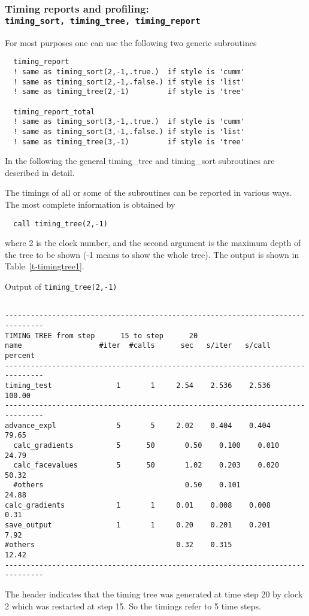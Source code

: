 \documentclass[10pt]{article}
\begin{document}
\subsubsection{Timing reports and profiling: \\
      {\tt timing\_sort, timing\_tree, timing\_report}}

For most purposes one can use the following two generic subroutines
\begin{verbatim}
  timing_report  
  ! same as timing_sort(2,-1,.true.)  if style is 'cumm'
  ! same as timing_sort(2,-1,.false.) if style is 'list'
  ! same as timing_tree(2,-1)         if style is 'tree'

  timing_report_total
  ! same as timing_sort(3,-1,.true.)  if style is 'cumm'
  ! same as timing_sort(3,-1,.false.) if style is 'list'
  ! same as timing_tree(3,-1)         if style is 'tree'
\end{verbatim}
In the following the general timing\_tree and timing\_sort
subroutines are described in detail. 

The timings of all or some of the subroutines can be reported
in various ways. The most complete information is obtained by
\begin{verbatim}
  call timing_tree(2,-1)
\end{verbatim}
where 2 is the clock number, and the second argument is the maximum
depth of the tree to be shown (-1 means to show the whole tree).
The output is shown in Table~\ref{t-timingtree1}.
\begin{table}
\caption{Output of {\tt timing\_tree(2,-1)}}
{\footnotesize
\begin{verbatim}

-------------------------------------------------------------------------------
TIMING TREE from step      15 to step      20
name                  #iter  #calls      sec   s/iter   s/call  percent
-------------------------------------------------------------------------------
timing_test               1       1     2.54    2.536    2.536   100.00
-------------------------------------------------------------------------------
advance_expl              5       5     2.02    0.404    0.404    79.65
  calc_gradients          5      50       0.50    0.100    0.010    24.79
  calc_facevalues         5      50       1.02    0.203    0.020    50.32
  #others                                 0.50    0.101             24.88
calc_gradients            1       1     0.01    0.008    0.008     0.31
save_output               1       1     0.20    0.201    0.201     7.92
#others                                 0.32    0.315             12.42
-------------------------------------------------------------------------------

\end{verbatim}
}
\label{t-timingtree1}
\end{table}
The header indicates that the timing tree was generated at time step 20
by clock 2 which was restarted at step 15. So the timings refer to
5 time steps. 
\end{document}
